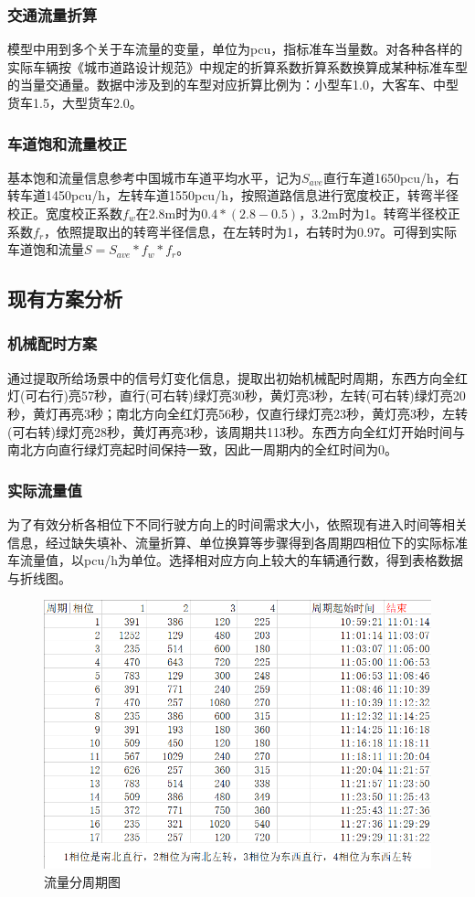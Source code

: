 \subsubsection{交通流量折算}
模型中用到多个关于车流量的变量，单位为pcu，指标准车当量数。对各种各样的实际车辆按《城市道路设计规范》中规定的折算系数折算系数换算成某种标准车型的当量交通量。数据中涉及到的车型对应折算比例为：小型车1.0，大客车、中型货车1.5，大型货车2.0。

\subsubsection{车道饱和流量校正}
基本饱和流量信息参考中国城市车道平均水平，记为$S_{ave}$直行车道1650pcu/h，右转车道1450pcu/h，左转车道1550pcu/h，按照道路信息进行宽度校正，转弯半径校正。宽度校正系数$f_w$在2.8m时为$0.4*(2.8-0.5)$，3.2m时为1。转弯半径校正系数$f_r$，依照提取出的转弯半径信息，在左转时为1，右转时为0.97。可得到实际车道饱和流量$S=S_{ave}*f_w*f_r$。

\subsection{现有方案分析}

\subsubsection{机械配时方案}
通过提取所给场景中的信号灯变化信息，提取出初始机械配时周期，东西方向全红灯(可右行)亮57秒，直行(可右转)绿灯亮30秒，黄灯亮3秒，左转(可右转)绿灯亮20秒，黄灯再亮3秒；南北方向全红灯亮56秒，仅直行绿灯亮23秒，黄灯亮3秒，左转(可右转)绿灯亮28秒，黄灯再亮3秒，该周期共113秒。东西方向全红灯开始时间与南北方向直行绿灯亮起时间保持一致，因此一周期内的全红时间为0。

\subsubsection{实际流量值}
为了有效分析各相位下不同行驶方向上的时间需求大小，依照现有进入时间等相关信息，经过缺失填补、流量折算、单位换算等步骤得到各周期四相位下的实际标准车流量值，以pcu/h为单位。选择相对应方向上较大的车辆通行数，得到表格数据与折线图。
\begin{figure}[H]
    \centering
    \includegraphics[scale=0.5]{figures/流量分周期图.png}
    \caption{流量分周期图}
    \label{fig:流量分周期图}
\end{figure}

